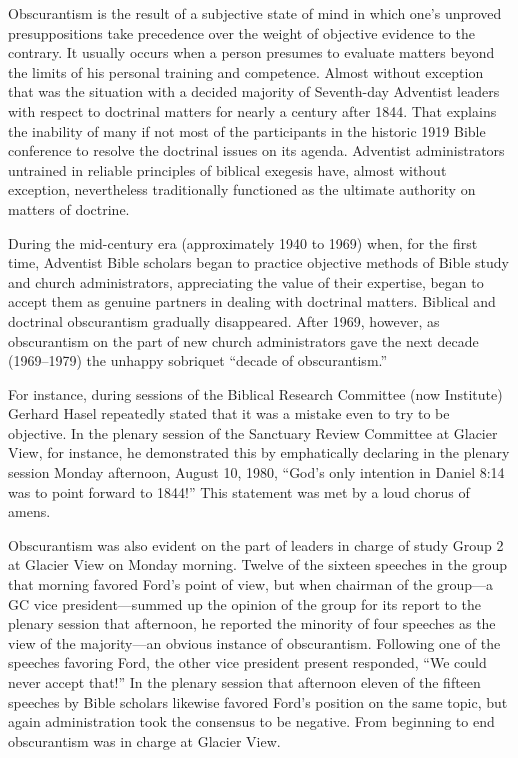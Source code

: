 Obscurantism is the result of a subjective state of mind in which one's
unproved presuppositions take precedence over the weight of objective
evidence to the contrary. It usually occurs when a person presumes to evaluate
matters beyond the limits of his personal training and competence.
Almost without exception that was the situation with a decided majority
of Seventh-day Adventist leaders with respect to doctrinal matters for nearly
a century after 1844. That explains the inability of many if not most of the
participants in the historic 1919 Bible conference to resolve the doctrinal
issues on its agenda. Adventist administrators untrained in reliable principles of
biblical exegesis have, almost without exception, nevertheless traditionally
functioned as the ultimate authority on matters of doctrine.

During the mid-century era (approximately 1940 to 1969) when, for the first
time, Adventist Bible scholars began to practice objective methods of Bible
study and church administrators, appreciating the value of their expertise,
began to accept them as genuine partners in dealing with doctrinal matters.
Biblical and doctrinal obscurantism gradually disappeared. After 1969,
however, as obscurantism on the part of new church administrators gave the
next decade (1969--1979) the unhappy sobriquet ``decade of obscurantism.''

For instance, during sessions of the Biblical Research Committee (now
Institute) Gerhard Hasel repeatedly stated that it was a mistake even to try
to be objective. In the plenary session of the Sanctuary Review Committee at
Glacier View, for instance, he demonstrated this by emphatically declaring
in the plenary session Monday afternoon, August 10, 1980, ``God's only
intention in Daniel 8:14 was to point forward to 1844!'' This statement was
met by a loud chorus of amens.

Obscurantism was also evident on the part of leaders in charge of study
Group 2 at Glacier View on Monday morning. Twelve of the sixteen speeches in
the group that morning favored Ford's point of view, but when chairman of
the group---a GC vice president---summed up the opinion of the group for its
report to the plenary session that afternoon, he reported the minority of
four speeches as the view of the majority---an obvious instance of
obscurantism. Following one of the speeches favoring Ford, the other vice
president present responded, ``We could never accept that!'' In the plenary
session that afternoon eleven of the fifteen speeches by Bible scholars
likewise favored Ford's position on the same topic, but again administration 
took the consensus to be negative. From beginning to end obscurantism was in
charge at Glacier View.

